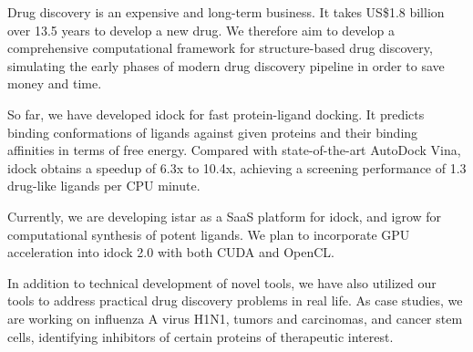 Drug discovery is an expensive and long-term business. It takes US\$1.8 billion over 13.5 years to develop a new drug. We therefore aim to develop a comprehensive computational framework for structure-based drug discovery, simulating the early phases of modern drug discovery pipeline in order to save money and time.

So far, we have developed idock for fast protein-ligand docking. It predicts binding conformations of ligands against given proteins and their binding affinities in terms of free energy. Compared with state-of-the-art AutoDock Vina, idock obtains a speedup of 6.3x to 10.4x, achieving a screening performance of 1.3 drug-like ligands per CPU minute.

Currently, we are developing istar as a SaaS platform for idock, and igrow for computational synthesis of potent ligands.
We plan to incorporate GPU acceleration into idock 2.0 with both CUDA and OpenCL.

In addition to technical development of novel tools, we have also utilized our tools to address practical drug discovery problems in real life. As case studies, we are working on influenza A virus H1N1, tumors and carcinomas, and cancer stem cells, identifying inhibitors of certain proteins of therapeutic interest.